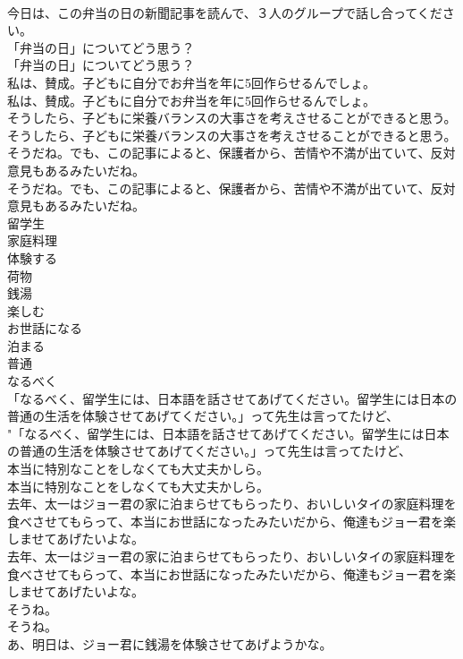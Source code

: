 \documentclass[8pt]{extreport}
\begin{document}
\begin{CJK}{UTF8}{min}
\\	今日は、この弁当の日の新聞記事を読んで、３人のグループで話し合ってください。 
\\	「弁当の日」についてどう思う？	
\\	「弁当の日」についてどう思う？ 
\\	私は、賛成。子どもに自分でお弁当を年に5回作らせるんでしょ。	
\\	私は、賛成。子どもに自分でお弁当を年に5回作らせるんでしょ。 
\\	そうしたら、子どもに栄養バランスの大事さを考えさせることができると思う。	
\\	そうしたら、子どもに栄養バランスの大事さを考えさせることができると思う。 
\\	そうだね。でも、この記事によると、保護者から、苦情や不満が出ていて、反対意見もあるみたいだね。	
\\	そうだね。でも、この記事によると、保護者から、苦情や不満が出ていて、反対意見もあるみたいだね。 
\\	留学生
\\	家庭料理
\\	体験する
\\	荷物
\\	銭湯
\\	楽しむ
\\	お世話になる
\\	泊まる
\\	普通
\\	なるべく
\\	「なるべく、留学生には、日本語を話させてあげてください。留学生には日本の普通の生活を体験させてあげてください。」って先生は言ってたけど、	
\\	"「なるべく、留学生には、日本語を話させてあげてください。留学生には日本の普通の生活を体験させてあげてください。」って先生は言ってたけど、 
\\	本当に特別なことをしなくても大丈夫かしら。	
\\	本当に特別なことをしなくても大丈夫かしら。 
\\	去年、太一はジョー君の家に泊まらせてもらったり、おいしいタイの家庭料理を食べさせてもらって、本当にお世話になったみたいだから、俺達もジョー君を楽しませてあげたいよな。	
\\	去年、太一はジョー君の家に泊まらせてもらったり、おいしいタイの家庭料理を食べさせてもらって、本当にお世話になったみたいだから、俺達もジョー君を楽しませてあげたいよな。 
\\	そうね。	
\\	そうね。 
\\	あ、明日は、ジョー君に銭湯を体験させてあげようかな。	

\end{CJK}
\end{document}
